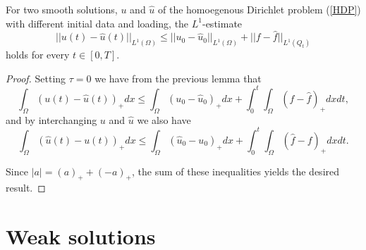 \documentclass[11pt, a4paper]{article}
\begin{document}
\begin{cor}[$L^1$-contractivity]
For two smooth solutions, $u$ and $\hat{u}$ of the homoegenous Dirichlet problem (\ref{HDP}) with different initial data and loading, the $L^1$-estimate
\begin{equation}
\label{l1_contractivity}
||u(t) - \hat{u}(t)||_{L^1(\Omega)} \leq ||u_0 - \hat{u}_0||_{L^1(\Omega)} + ||f-\hat{f}||_{L^1(Q_t)}
\end{equation}
holds for every $t\in [0,T]$.
\end{cor}

\begin{proof}
Setting $\tau = 0$ we have from the previous lemma that
\begin{equation*}
\int_\Omega  (u(t)-\hat{u}(t))_+dx \leq \int_\Omega (u_0 - \hat{u}_0)_+dx + \int_0^t \int_\Omega (f-\hat{f})_+ dxdt,
\end{equation*}
and by interchanging $u$ and $\hat{u}$ we also have 
\begin{equation*}
\int_\Omega  (\hat{u}(t)-u(t))_+dx \leq \int_\Omega (\hat{u}_0 - u_0)_+dx + \int_0^t \int_\Omega (\hat{f}-f)_+ dxdt.
\end{equation*}

Since $|a| = (a)_+ + (-a)_+$, the sum of these inequalities yields the desired result.
\end{proof}

\setcounter{obs}{0}
\begin{obs}

\end{obs}













 

\section{Weak solutions}



\newpage


\end{document}
